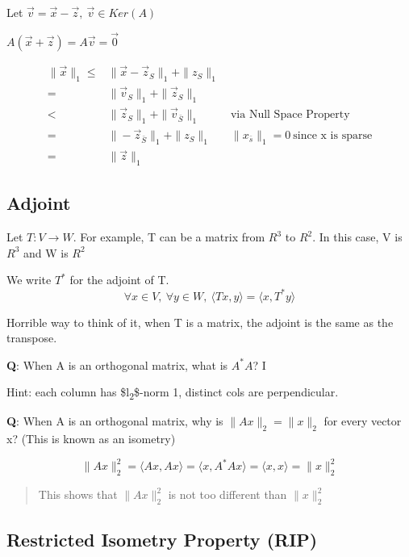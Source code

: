 \documentclass[11pt]{article}
\begin{document}
Let \(\vec v = \vec x - \vec z, \ \vec v \in Ker(A)\)

\(A (\vec x + \vec z) = A \vec v = \vec 0\)

\begin{subequations}
\label{first:main}
\begin{align}
\|\vec x\|_1 \leq & \|\vec x - \vec z_S\|_1 + \|z_{S}\|_1 \\
= & \| \vec v_S\|_1 + \| \vec z_S \|_1\\
< & \| \vec z_S\|_1 + \| \vec v_{\bar S}\|_1 & \ \text{via Null Space Property}\\
= & \| - \vec z_{\bar S} \|_1 + \| z_S\|_1 & \ \|x_{\bar s}\|_1 = 0 \ \text{since x is sparse}\\
= & \| \vec z \|_1
\end{align}
\end{subequations}



\subsection{Adjoint}
\label{sec:org69cffce}

Let \(T \colon V \to W\). For example, T can be a matrix from \(R^3\) to \(R^2\). In this
case, V is \(R^3\) and W is \(R^2\)

We write \(T^*\) for the adjoint of T.
$$
\forall x \in V, \ \forall y \in W, \ \langle Tx, y \rangle = \langle x, T^* y \rangle
$$

Horrible way to think of it, when T is a matrix, the adjoint is the same as the
transpose.

\textbf{Q}: When A is an orthogonal matrix, what is \(A^* A\)? I

Hint: each column has \$l\textsubscript{2}\$-norm 1, distinct cols are perpendicular.

\textbf{Q}: When A is an orthogonal matrix, why is \(\| Ax \|_2 = \| x \|_2\) for every
 vector x? (This is known as an isometry)

$$
 \| Ax \|_2^2 = \langle Ax, Ax \rangle = \langle x, A^* Ax \rangle = \langle x, x
 \rangle = \| x \|_2^2
 $$

\begin{quote}
This shows that \(\|Ax\|_2^2\) is not too different than \(\|x\|_2^2\)
\end{quote}


\subsection{Restricted Isometry Property (RIP)}
\label{sec:org159f195}
\end{document}

